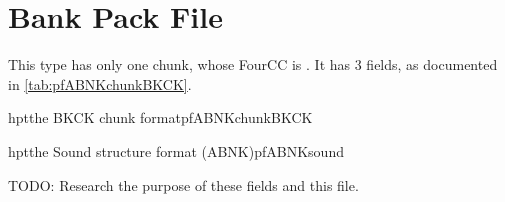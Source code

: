 \section{Bank Pack File}
\label{sec:pfABNK}

This type has only one chunk, whose FourCC is .  It
has 3 fields, as documented in \autoref{tab:pfABNKchunkBKCK}.


\begin{datastructure}{hpt}{the BKCK chunk format}{pfABNKchunkBKCK}
\end{datastructure}

\begin{datastructure}{hpt}{the Sound structure format (ABNK)}{pfABNKsound}
\end{datastructure}

TODO: Research the purpose of these fields and this file.

\clearpage

